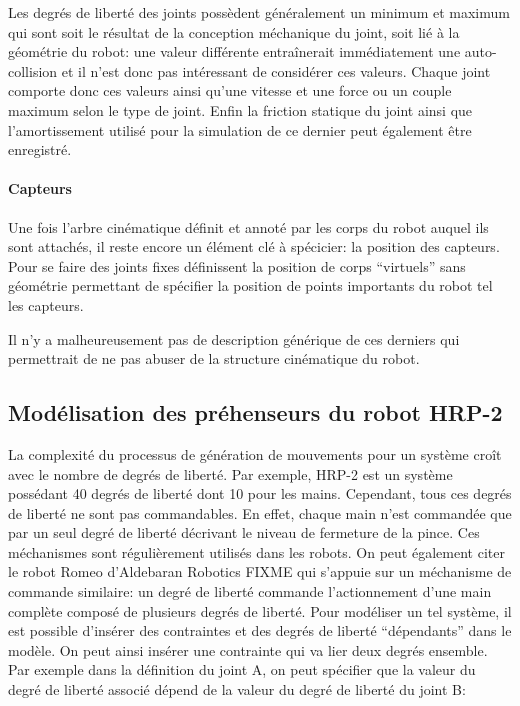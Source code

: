 Les degrés de liberté des joints possèdent généralement un minimum et
maximum qui sont soit le résultat de la conception méchanique du
joint, soit lié à la géométrie du robot: une valeur différente
entraînerait immédiatement une auto-collision et il n'est donc pas
intéressant de considérer ces valeurs. Chaque joint comporte donc ces
valeurs ainsi qu'une vitesse et une force ou un couple maximum selon
le type de joint. Enfin la friction statique du joint ainsi que
l'amortissement utilisé pour la simulation de ce dernier peut
également être enregistré.


\paragraph{Capteurs}

Une fois l'arbre cinématique définit et annoté par les corps du robot
auquel ils sont attachés, il reste encore un élément clé à spécicier:
la position des capteurs. Pour se faire des joints fixes définissent
la position de corps ``virtuels'' sans géométrie permettant de
spécifier la position de points importants du robot tel les capteurs.

Il n'y a malheureusement pas de description générique de ces derniers
qui permettrait de ne pas abuser de la structure cinématique du robot.


\subsection{Modélisation des préhenseurs du robot HRP-2}

La complexité du processus de génération de mouvements pour un système
croît avec le nombre de degrés de liberté. Par exemple, HRP-2 est un
système possédant 40 degrés de liberté dont 10 pour les
mains. Cependant, tous ces degrés de liberté ne sont pas
commandables. En effet, chaque main n'est commandée que par un seul
degré de liberté décrivant le niveau de fermeture de la pince. Ces
méchanismes sont régulièrement utilisés dans les robots. On peut
également citer le robot Romeo d'Aldebaran Robotics FIXME qui s'appuie
sur un méchanisme de commande similaire: un degré de liberté commande
l'actionnement d'une main complète composé de plusieurs degrés de
liberté. Pour modéliser un tel système, il est possible d'insérer des
contraintes et des degrés de liberté ``dépendants'' dans le modèle. On
peut ainsi insérer une contrainte qui va lier deux degrés
ensemble. Par exemple dans la définition du joint A, on peut spécifier
que la valeur du degré de liberté associé dépend de la valeur du degré
de liberté du joint B:

